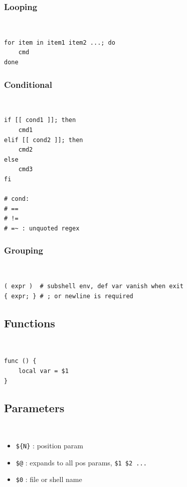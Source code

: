 \documentclass{article}
\begin{document}
\subsubsection{Looping}
\begin{definition}[looping]~
    \begin{verbatim}
for item in item1 item2 ...; do
    cmd
done
\end{verbatim}
\end{definition}

\subsubsection{Conditional}
\begin{definition}[conditional]~
    \begin{verbatim}
if [[ cond1 ]]; then
    cmd1
elif [[ cond2 ]]; then
    cmd2
else
    cmd3
fi

# cond:
# ==
# !=
# =~ : unquoted regex
\end{verbatim}
\end{definition}

\subsubsection{Grouping}
\begin{definition}[grouping]~
    \begin{verbatim}
( expr )  # subshell env, def var vanish when exit
{ expr; } # ; or newline is required
\end{verbatim}
\end{definition}

\subsection{Functions}
\begin{definition}[function]~
    \begin{verbatim}
func () {
    local var = $1
}
\end{verbatim}
\end{definition}

\subsection{Parameters}
\begin{definition}[parameters]~
    \begin{itemize}
        \item \verb|${N}| : position param
        \item \verb|$@| : expands to all pos params, \verb|$1 $2 ...|
        \item \verb|$0| : file or shell name
    \end{itemize}
\end{definition}
\end{document}
